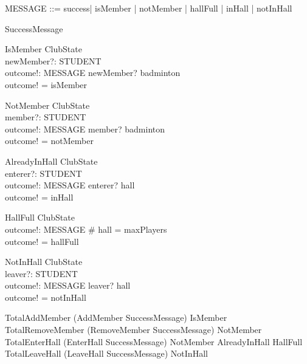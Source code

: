 \documentclass{article}
\begin{document}
\begin{zed}
MESSAGE ::= success| isMember | notMember | hallFull | inHall | notInHall
\end{zed}

\begin{zed}
SuccessMessage 
\end{zed}

\begin{schema}{IsMember}
\Xi ClubState \\
newMember?: STUDENT \\
outcome!: MESSAGE
\where
newMember? \in badminton \\
outcome! = isMember
\end{schema}

\begin{schema}{NotMember}
\Xi ClubState \\
member?: STUDENT \\
outcome!: MESSAGE
\where
member? \notin badminton \\
outcome! = notMember
\end{schema}

\begin{schema}{AlreadyInHall}
\Xi ClubState \\
enterer?: STUDENT \\
outcome!: MESSAGE
\where
enterer? \in hall \\
outcome! = inHall
\end{schema}

\begin{schema}{HallFull}
\Xi ClubState \\
outcome!: MESSAGE
\where
\# hall = maxPlayers \\
outcome! = hallFull
\end{schema}

\begin{schema}{NotInHall}
\Xi ClubState \\
leaver?: STUDENT\\
outcome!: MESSAGE
\where
leaver? \notin hall \\
outcome! = notInHall
\end{schema}

\begin{zed}
TotalAddMember  (AddMember \land SuccessMessage) \lor IsMember \\
TotalRemoveMember  (RemoveMember \land SuccessMessage) \lor NotMember \\
TotalEnterHall  (EnterHall \land SuccessMessage) \lor NotMember \lor AlreadyInHall \lor HallFull \\
TotalLeaveHall  (LeaveHall \land SuccessMessage) \lor NotInHall
\end{zed}
\end{document}
